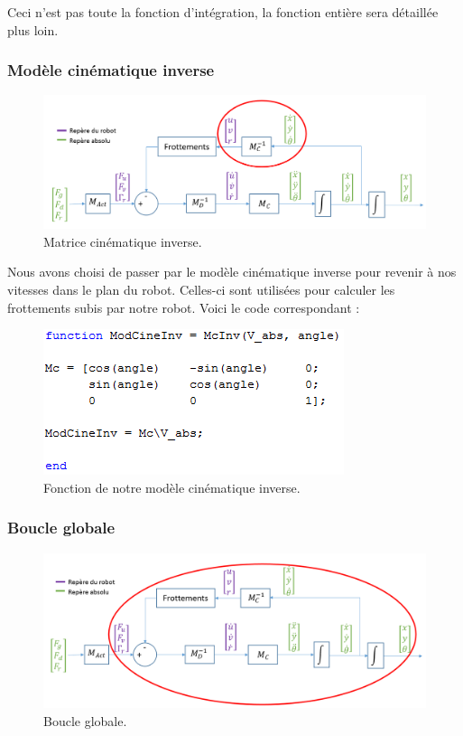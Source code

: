 \documentclass[a4paper,10pt]{article}
\begin{document}
Ceci n’est pas toute la fonction d’intégration, la fonction entière sera détaillée plus loin.

\subsubsection{Modèle cinématique inverse}
\begin{figure}[H]
\bigcenter\includegraphics[scale=0.5]{images/modelecinematiqueinverse.png}
\caption{Matrice cinématique inverse.}
\end{figure}

Nous avons choisi de passer par le modèle cinématique inverse pour revenir à nos vitesses dans le plan du robot. Celles-ci sont utilisées pour calculer les frottements subis par notre robot. Voici le code correspondant :

\begin{figure}[H]
\bigcenter\includegraphics[scale=0.8]{images/cinematique_inverse.png}
\caption{Fonction de notre modèle cinématique inverse.}
\end{figure}

\subsubsection{Boucle globale}
\begin{figure}[H]
\bigcenter\includegraphics[scale=0.5]{images/boucle_global.png}
\caption{Boucle globale.}
\end{figure}
\end{document}
